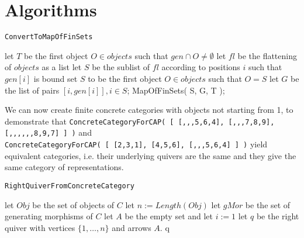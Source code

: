 
\section{Algorithms}

\begin{algorithm}\capstart
   \caption{\texttt{ConvertToMapOfFinSets}}\label{algo:ConvertToMapOfFinSets}
      \BlankLine
      let $T$ be the first object $O \in objects$ such that $gen \cap O \not= \emptyset$\;
      let $fl$ be the flattening of $objects$ as a list\;
      let $S$ be the sublist of $fl$ according to positions $i$ such that $gen[i]$ is bound\;
      set $S$ to be the first object $O \in objects$ such that $O = S$\;
      \BlankLine
      let $G$ be the list of pairs $[ i, gen[i] ], i \in S$;
      \BlankLine
      \Return MapOfFinSets( S, G, T );
\end{algorithm}

We can now create finite concrete categories with objects not starting from 1, to demonstrate that
\texttt{ConcreteCategoryForCAP( [ [,,,5,6,4], [,,,7,8,9], [,,,,,,8,9,7] ] )} and\\
\texttt{ConcreteCategoryForCAP( [ [2,3,1], [4,5,6], [,,,5,6,4] ] )} yield
equivalent categories, i.e. their underlying quivers are the same and they give the same category of representations.

\begin{algorithm}\capstart
    \caption{\texttt{RightQuiverFromConcreteCategory}}\label{algo:RightQuiverFromConcreteCategory}
	\BlankLine
	let $Obj$ be the set of objects of $C$\;
	let $n := Length(Obj)$\;
	let $gMor$ be the set of generating morphisms of $C$\;
	let $A$ be the empty set and let $i := 1$\;
	\BlankLine
	let $q$ be the right quiver with vertices $\{1,\dots,n\}$ and arrows $A$.
	\BlankLine
	\Return q\;
\end{algorithm}


